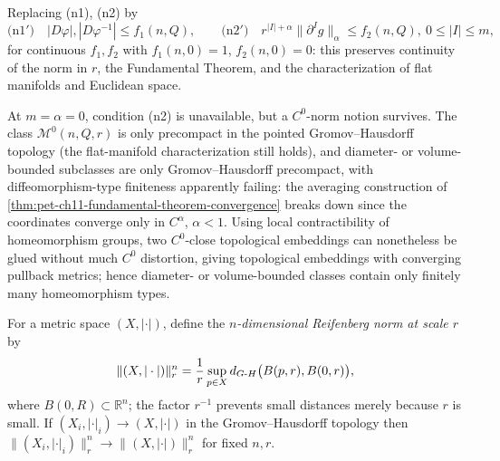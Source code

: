 \begin{remark}
  \label{rem:pet-ch11-alternative-norm-conditions}
  Replacing (n1), (n2) by
  \[
    \text{(n1$'$)}\quad|D\varphi|,|D\varphi^{-1}|\le f_1(n,Q),\qquad
    \text{(n2$'$)}\quad r^{|I|+\alpha}\|\partial^Ig\|_\alpha\le f_2(n,Q),\ 0\le|I|\le m,
  \]
  for continuous $f_1,f_2$ with $f_1(n,0)=1$, $f_2(n,0)=0$: this preserves
  continuity of the norm in $r$, the Fundamental Theorem, and the
  characterization of flat manifolds and Euclidean space.
\end{remark}

\begin{remark}
  \label{rem:pet-ch11-c0-norm-precompactness-only}
  At $m=\alpha=0$, condition (n2) is unavailable, but a $C^0$-norm notion
  survives. The class $\mathcal{M}^0(n,Q,r)$ is only precompact in the
  pointed Gromov--Hausdorff topology (the flat-manifold characterization
  still holds), and diameter- or volume-bounded subclasses are only
  Gromov--Hausdorff precompact, with diffeomorphism-type finiteness
  apparently failing: the averaging construction of
  \cref{thm:pet-ch11-fundamental-theorem-convergence} breaks down since the
  coordinates converge only in $C^{\alpha}$, $\alpha<1$. Using local
  contractibility of homeomorphism groups, two $C^0$-close topological
  embeddings can nonetheless be glued without much $C^0$ distortion, giving
  topological embeddings with converging pullback metrics; hence
  diameter- or volume-bounded classes contain only finitely many
  homeomorphism types.
\end{remark}

\begin{definition}
  \label{def:pet-ch11-reifenberg-norm}
  For a metric space $(X,|\cdot|)$, define the \emph{$n$-dimensional Reifenberg norm
  at scale $r$} by
  \[
    \|(X,|\cdot|)\|^n_r=\frac1r\sup_{p\in X}d_{G\text{-}H}\big(B(p,r),B(0,r)\big),
  \]
  where $B(0,R)\subset\mathbb{R}^n$; the factor $r^{-1}$ prevents small distances
  merely because $r$ is small. If $(X_i,|\cdot|_i)\to(X,|\cdot|)$ in the
  Gromov--Hausdorff topology then $\|(X_i,|\cdot|_i)\|^n_r\to\|(X,|\cdot|)\|^n_r$
  for fixed $n,r$.
\end{definition}

